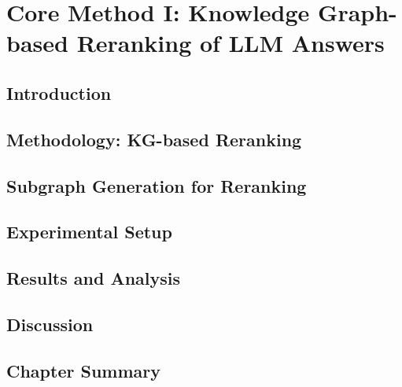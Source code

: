 \chapter{Core Method I: Knowledge Graph-based Reranking of LLM Answers}
\label{ch:reranking}

\section{Introduction}
\label{sec:rerank:intro}

\section{Methodology: KG-based Reranking}
\label{sec:rerank:method}

\section{Subgraph Generation for Reranking}
\label{sec:rerank:subgraphs}

\section{Experimental Setup}
\label{sec:rerank:setup}

\section{Results and Analysis}
\label{sec:rerank:results}

\section{Discussion}
\label{sec:rerank:discussion}

\section{Chapter Summary}
\label{sec:rerank:summary}
